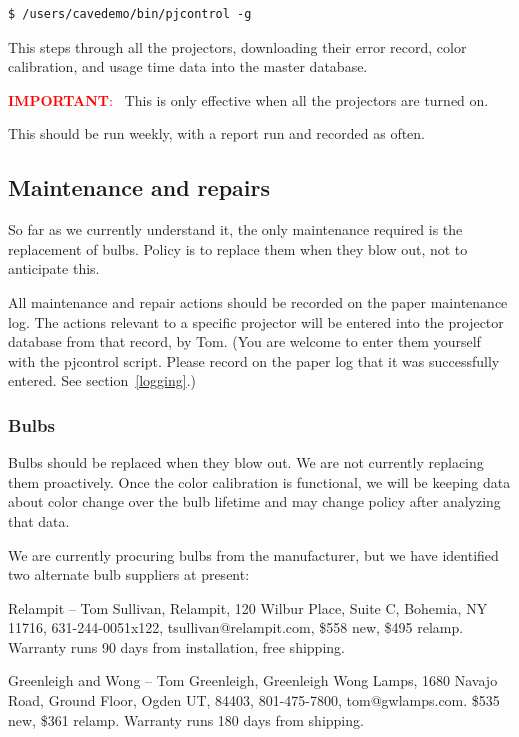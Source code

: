 \documentclass[11pt]{article}
\newenvironment{note}[1][Note]{\begin{lrbox}{\notebox}%
    \begin{minipage}{0.9\columnwidth}\textcolor{red}{\textbf{#1}:~}}%
    {\end{minipage}\end{lrbox}\begin{center}\setlength{\fboxsep}{8pt}%
    \fbox{\usebox{\notebox}}\end{center}}
\begin{document}
\begin{verbatim}
$ /users/cavedemo/bin/pjcontrol -g
\end{verbatim}

This steps through all the projectors, downloading their error
record, color calibration, and usage time data into the master
database.

\begin{note}[IMPORTANT]
This is only effective when all the projectors are turned on.
\end{note}

This should be run weekly, with a report run and recorded as often.


\subsection{Maintenance and repairs}

So far as we currently understand it, the only maintenance required is
the replacement of bulbs.  Policy is to replace them when they blow
out, not to anticipate this.

All maintenance and repair actions should be recorded on the paper
maintenance log.  The actions relevant to a specific projector will be
entered into the projector database from that record, by Tom.  (You
are welcome to enter them yourself with the pjcontrol script.  Please
record on the paper log that it was successfully entered.  See
section~\ref{logging}.) 


\subsubsection{Bulbs}

Bulbs should be replaced when they blow out.  We are not currently
replacing them proactively.  Once the color calibration is functional,
we will be keeping data about color change over the bulb lifetime and
may change policy after analyzing that data.

We are currently procuring bulbs from the manufacturer, but we have
identified two alternate bulb suppliers at present:

Relampit -- Tom Sullivan, Relampit, 120 Wilbur Place, Suite C,
Bohemia, NY 11716, 631-244-0051x122, tsullivan@relampit.com, \$558
new, \$495 relamp.  Warranty runs 90 days from installation, free
shipping.

Greenleigh and Wong -- Tom Greenleigh, Greenleigh Wong Lamps, 1680
Navajo Road, Ground Floor, Ogden UT, 84403, 801-475-7800,
tom@gwlamps.com. \$535 new, \$361 relamp.  Warranty runs 180 days from
shipping.
\end{document}
